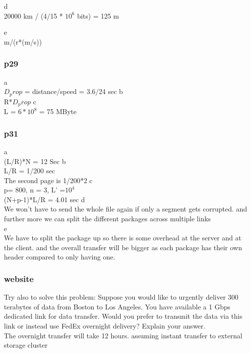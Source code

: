 \documentclass[a4paper,10pt,titlepage]{report}
\begin{document}
\vspace{10mm}
d\\
20000 km / (4/15 * $10^6$ bits) = 125 m

\vspace{10mm}
e\\
m/(r*(m/s))

\subsubsection{p29}
a\\
$D_prop$ = distance/speed = 3.6/24 sec
\vspace{10mm}
b\\
R*$D_prop$
\vspace{10mm}
c\\
L = $6*10^8$ = 75 MByte

\subsubsection{p31}
a\\
(L/R)*N = 12 Sec
\vspace{10mm}
b\\
L/R = 1/200 sec\\
The second page is 1/200*2
\vspace{10mm}
c\\
p= 800, n = 3, L' =$10^4$ \\
(N+p-1)*L/R = 4.01 sec 
\vspace{10mm}
d\\
We won't have to send the whole file again if only a segment gets corrupted. and further more we can split the different packages across multiple links \\

\vspace{10mm}
e\\
We have to split the package up so there is some overhead at the server and at the client. and the overall transfer will be bigger as each package has their own header compared to only having one. \\

\subsubsection{website}

Try also to solve this problem: Suppose you would like to urgently deliver 300 terabytes of data from Boston to Los Angeles. You have available a 1 Gbps dedicated link for data transfer. Would you prefer to transmit the data via this link or instead use FedEx overnight delivery? Explain your answer. \\
The overnight transfer will take 12 hours. assuming instant transfer to external storage cluster \\
\end{document}

